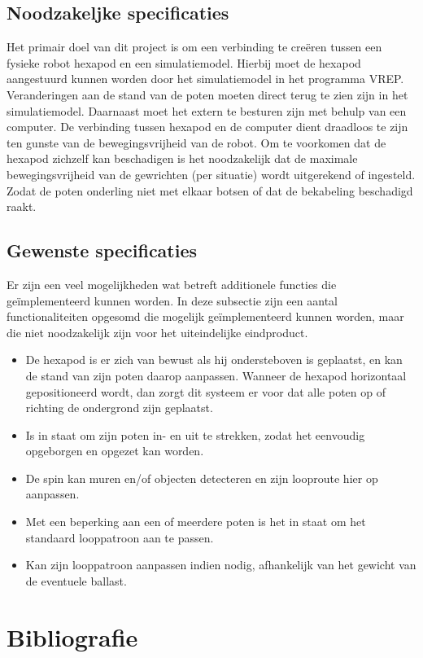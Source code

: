 \documentclass[10pt,a4paper]{article}
\begin{document}
\subsection{Noodzakeljke specificaties}
Het primair doel van dit project is om een verbinding te cre\"eren tussen een fysieke robot hexapod en een simulatiemodel. Hierbij moet de hexapod aangestuurd kunnen worden door het simulatiemodel in het programma VREP. Veranderingen aan de stand van de poten moeten direct terug te zien zijn in het simulatiemodel. Daarnaast moet het extern te besturen zijn met behulp van een computer. De verbinding tussen hexapod en de computer dient draadloos te zijn ten gunste van de bewegingsvrijheid van de robot. %
Om te voorkomen dat de hexapod zichzelf kan beschadigen is het noodzakelijk dat de maximale bewegingsvrijheid van de gewrichten (per situatie) wordt uitgerekend of ingesteld. Zodat de poten onderling niet met elkaar botsen of dat de bekabeling beschadigd raakt.

\subsection{Gewenste specificaties}
Er zijn een veel mogelijkheden wat betreft additionele functies die ge\"implementeerd kunnen worden. In deze subsectie zijn een aantal functionaliteiten opgesomd die mogelijk ge\"implementeerd kunnen worden, maar die niet noodzakelijk zijn voor het uiteindelijke eindproduct.

\begin{itemize}
\setlength\itemsep{0em}
\item De hexapod is er zich van bewust als hij ondersteboven is geplaatst, en kan de stand van zijn poten daarop aanpassen. Wanneer de hexapod horizontaal gepositioneerd wordt, dan zorgt dit systeem er voor dat alle poten op of richting de ondergrond zijn geplaatst.
\item Is in staat om zijn poten in- en uit te strekken, zodat het eenvoudig opgeborgen en opgezet kan worden.
\item De spin kan muren en/of objecten detecteren en zijn looproute hier op aanpassen. 
\item Met een beperking aan een of meerdere poten is het in staat om het standaard looppatroon aan te passen.
\item Kan zijn looppatroon aanpassen indien nodig, afhankelijk van het gewicht van de eventuele ballast.
\end{itemize}

\newpage

\section{Bibliografie}


\end{document}
